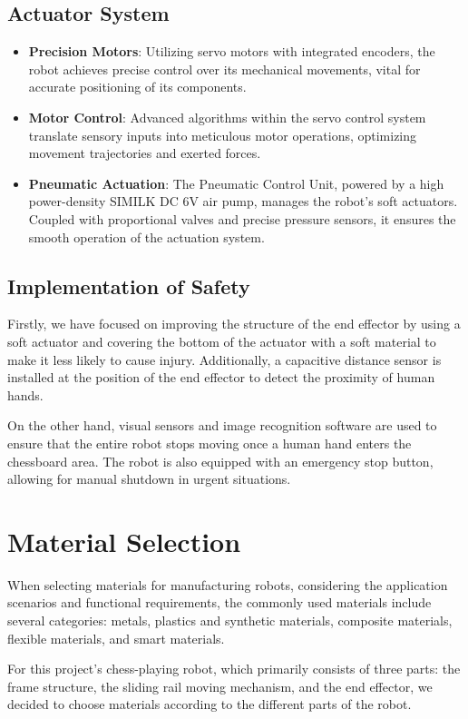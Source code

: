 \documentclass[10pt, a4paper, twocolumn]{article}
\begin{document}
\subsection{Actuator System}

\begin{itemize}
    \item \textbf{Precision Motors}: Utilizing servo motors with integrated encoders, the robot achieves precise control over its mechanical movements, vital for accurate positioning of its components.
    \item \textbf{Motor Control}: Advanced algorithms within the servo control system translate sensory inputs into meticulous motor operations, optimizing movement trajectories and exerted forces.
    \item \textbf{Pneumatic Actuation}: The Pneumatic Control Unit, powered by a high power-density SIMILK DC 6V air pump, manages the robot's soft actuators. Coupled with proportional valves and precise pressure sensors, it ensures the smooth operation of the actuation system.
\end{itemize}

\subsection{Implementation of Safety}
Firstly, we have focused on improving the structure of the end effector by using a soft actuator and covering the bottom of the actuator with a soft material to make it less likely to cause injury. Additionally, a capacitive distance sensor is installed at the position of the end effector to detect the proximity of human hands.

On the other hand, visual sensors and image recognition software are used to ensure that the entire robot stops moving once a human hand enters the chessboard area. The robot is also equipped with an emergency stop button, allowing for manual shutdown in urgent situations.

\section{Material Selection}
When selecting materials for manufacturing robots, considering the application scenarios and functional requirements, the commonly used materials include several categories: metals, plastics and synthetic materials, composite materials, flexible materials, and smart materials.

For this project's chess-playing robot, which primarily consists of three parts: the frame structure, the sliding rail moving mechanism, and the end effector, we decided to choose materials according to the different parts of the robot.
\end{document}
